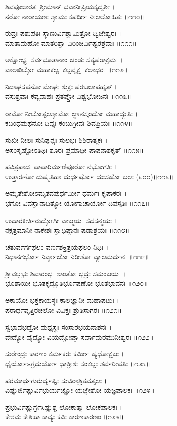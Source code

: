 ಶಿವಪೂಜಾರತಃ ಶ್ರೀಮಾನ್ ಭವಾನೀಪ್ರಿಯಕೃದ್ವಶೀ ।\\
ನರೋ ನಾರಾಯಣಃ ಶ್ಯಾಮಃ ಕಪರ್ದೀ ನೀಲಲೋಹಿತಃ ॥೧೧೦॥

ರುದ್ರಃ ಪಶುಪತಿಃ ಸ್ಥಾಣುರ್ವಿಶ್ವಾಮಿತ್ರೋ ದ್ವಿಜೇಶ್ವರಃ ।\\
ಮಾತಾಮಹೋ ಮಾತರಿಶ್ವಾ ವಿರಿಂಚಿರ್ವಿಷ್ಟರಶ್ರವಾಃ ॥೧೧೧॥

ಅಕ್ಷೋಭ್ಯಃ ಸರ್ವಭೂತಾನಾಂ ಚಂಡಃ ಸತ್ಯಪರಾಕ್ರಮಃ ।\\
ವಾಲಖಿಲ್ಯೋ ಮಹಾಕಲ್ಪಃ ಕಲ್ಪವೃಕ್ಷಃ ಕಲಾಧರಃ ॥೧೧೨॥

ನಿದಾಘಸ್ತಪನೋ ಮೇಘಃ ಶುಕ್ರಃ ಪರಬಲಾಪಹೃತ್ ।\\
ವಸುಶ್ರವಾಃ ಕವ್ಯವಾಹಃ ಪ್ರತಪ್ತೋ ವಿಶ್ವಭೋಜನಃ ॥೧೧೩॥

ರಾಮೋ ನೀಲೋತ್ಪಲಶ್ಯಾಮೋ ಜ್ಞಾನಸ್ಕಂದೋ ಮಹಾದ್ಯುತಿಃ ।\\
ಕಬಂಧಮಥನೋ ದಿವ್ಯಃ ಕಂಬುಗ್ರೀವಃ ಶಿವಪ್ರಿಯಃ ॥೧೧೪॥

ಸುಖೀ ನೀಲಃ ಸುನಿಷ್ಪನ್ನಃ ಸುಲಭಃ ಶಿಶಿರಾತ್ಮಕಃ ।\\
ಅಸಂಸೃಷ್ಟೋಽತಿಥಿಃ ಶೂರಃ ಪ್ರಮಾಥೀ ಪಾಪನಾಶಕೃತ್ ॥೧೧೫॥

ಪವಿತ್ರಪಾದಃ ಪಾಪಾರಿರ್ಮಣಿಪೂರೋ ನಭೋಗತಿಃ ।\\
ಉತ್ತಾರಣೋ ದುಷ್ಕೃತಿಹಾ ದುರ್ಧರ್ಷೋ ದುಃಸಹೋ ಬಲಃ (೬೦೦)॥೧೧೬॥

ಅಮೃತೇಶೋಽಮೃತವಪುರ್ಧರ್ಮೀ ಧರ್ಮಃ ಕೃಪಾಕರಃ ।\\
ಭಗೋ ವಿವಸ್ವಾನಾದಿತ್ಯೋ ಯೋಗಾಚಾರ್ಯೋ ದಿವಸ್ಪತಿಃ ॥೧೧೭॥

ಉದಾರಕೀರ್ತಿರುದ್ಯೋಗೀ ವಾಙ್ಮಯಃ ಸದಸನ್ಮಯಃ ।\\
ನಕ್ಷತ್ರಮಾನೀ ನಾಕೇಶಃ ಸ್ವಾಧಿಷ್ಠಾನಃ ಷಡಾಶ್ರಯಃ ॥೧೧೮॥

ಚತುರ್ವರ್ಗಫಲಂ ವರ್ಣಶಕ್ತಿತ್ರಯಫಲಂ ನಿಧಿಃ ।\\
ನಿಧಾನಗರ್ಭೋ ನಿರ್ವ್ಯಾಜೋ ನಿರೀಶೋ ವ್ಯಾಲಮರ್ದನಃ ॥೧೧೯॥

ಶ್ರೀವಲ್ಲಭಃ ಶಿವಾರಂಭಃ ಶಾಂತೋ ಭದ್ರಃ ಸಮಂಜಯಃ ।\\
ಭೂಶಾಯೀ ಭೂತಕೃದ್ಭೂತಿರ್ಭೂಷಣೋ ಭೂತಭಾವನಃ ॥೧೨೦॥

ಅಕಾಯೋ ಭಕ್ತಕಾಯಸ್ಥಃ ಕಾಲಜ್ಞಾನೀ ಮಹಾಪಟುಃ ।\\
ಪರಾರ್ಧವೃತ್ತಿರಚಲೋ ವಿವಿಕ್ತಃ ಶ್ರುತಿಸಾಗರಃ ॥೧೨೧॥

ಸ್ವಭಾವಭದ್ರೋ ಮಧ್ಯಸ್ಥಃ ಸಂಸಾರಭಯನಾಶನಃ ।\\
ವೇದ್ಯೋ ವೈದ್ಯೋ ವಿಯದ್ಗೋಪ್ತಾ ಸರ್ವಾಮರಮುನೀಶ್ವರಃ ॥೧೨೨॥

ಸುರೇಂದ್ರಃ ಕಾರಣಂ ಕರ್ಮಕರಃ ಕರ್ಮೀ ಹ್ಯಧೋಕ್ಷಜಃ ।\\
ಧೈರ್ಯೋಽಗ್ರಧುರ್ಯೋ ಧಾತ್ರೀಶಃ ಸಂಕಲ್ಪಃ ಶರ್ವರೀಪತಿಃ ॥೧೨೩॥

ಪರಮಾರ್ಥಗುರುರ್ದೃಷ್ಟಿಃ ಸುಚಿರಾಶ್ರಿತವತ್ಸಲಃ ।\\
ವಿಷ್ಣುರ್ಜಿಷ್ಣುರ್ವಿಭುರ್ಯಜ್ಞೋ ಯಜ್ಞೇಶೋ ಯಜ್ಞಪಾಲಕಃ ॥೧೨೪॥

ಪ್ರಭುರ್ವಿಷ್ಣುರ್ಗ್ರಸಿಷ್ಣುಶ್ಚ ಲೋಕಾತ್ಮಾ ಲೋಕಪಾಲಕಃ ।\\
ಕೇಶವಃ ಕೇಶಿಹಾ ಕಾವ್ಯಃ ಕವಿಃ ಕಾರಣಕಾರಣಂ ॥೧೨೫॥

